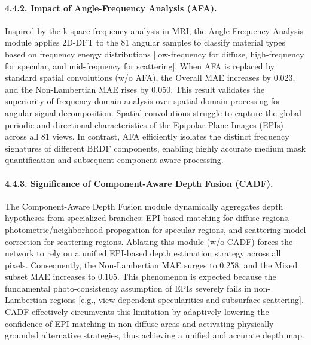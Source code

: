 \paragraph{4.4.2. Impact of Angle-Frequency Analysis (AFA).}
Inspired by the k-space frequency analysis in MRI, the Angle-Frequency Analysis module applies 2D-DFT to the 81 angular samples to classify material types based on frequency energy distributions  [low-frequency for diffuse, high-frequency for specular, and mid-frequency for scattering]. When AFA is replaced by standard spatial convolutions (w/o AFA), the Overall MAE increases by 0.023, and the Non-Lambertian MAE rises by 0.050. This result validates the superiority of frequency-domain analysis over spatial-domain processing for angular signal decomposition. Spatial convolutions struggle to capture the global periodic and directional characteristics of the Epipolar Plane Images (EPIs) across all 81 views. In contrast, AFA efficiently isolates the distinct frequency signatures of different BRDF components, enabling highly accurate medium mask quantification and subsequent component-aware processing.

\paragraph{4.4.3. Significance of Component-Aware Depth Fusion (CADF).}
The Component-Aware Depth Fusion module dynamically aggregates depth hypotheses from specialized branches: EPI-based matching for diffuse regions, photometric/neighborhood propagation for specular regions, and scattering-model correction for scattering regions. Ablating this module (w/o CADF) forces the network to rely on a unified EPI-based depth estimation strategy across all pixels. Consequently, the Non-Lambertian MAE surges to 0.258, and the Mixed subset MAE increases to 0.105. This phenomenon is expected because the fundamental photo-consistency assumption of EPIs severely fails in non-Lambertian regions  [e.g., view-dependent specularities and subsurface scattering]. CADF effectively circumvents this limitation by adaptively lowering the confidence of EPI matching in non-diffuse areas and activating physically grounded alternative strategies, thus achieving a unified and accurate depth map.

